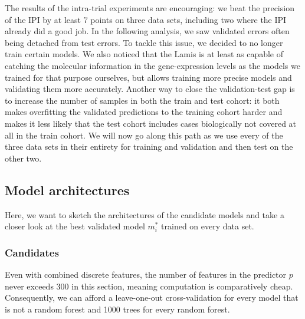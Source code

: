 The results of the intra-trial experiments are encouraging: we beat the precision of the IPI by 
at least \num{7} points on three data sets, including two where the IPI already did a good job. 
In the following analysis, we saw validated errors often being detached from test errors. To tackle 
this issue, we decided to no longer train certain models. We also noticed that the Lamis is at least 
as capable of catching the molecular information in the gene-expression levels as the models
we trained for that purpose ourselves, but allows training more precise models and validating them 
more accurately. Another way to close the validation-test gap is to increase the number of samples 
in both the train and test cohort: it both makes overfitting the validated predictions to the 
training cohort harder and makes it less likely that the test cohort includes cases biologically 
not covered at all in the train cohort. We will now go along this path as we use every of the 
three data sets in their entirety for training and validation and then test on the other two.

\subsection{Model architectures}

Here, we want to sketch the architectures of the candidate models and take a closer look at the 
best validated model $m_i^*$ trained on every data set.

\subsubsection{Candidates}

Even with combined discrete features, the number of features in the predictor $p$ 
never exceeds \num{300} in this section, meaning computation is comparatively cheap. 
Consequently, we can afford 
a leave-one-out cross-validation for every model that is not a random forest and \num{1000} trees 
for every random forest.

